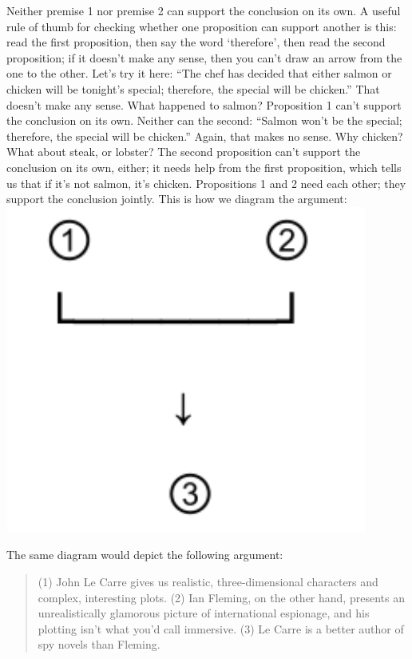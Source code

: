 Neither premise 1 nor premise 2 can support the conclusion on its own. A useful rule of thumb for
checking whether one proposition can support another is this: read the first proposition, then say
the word `therefore', then read the second proposition; if it doesn't make any sense, then you can't
draw an arrow from the one to the other. Let's try it here: ``The chef has decided that either salmon
or chicken will be tonight's special; therefore, the special will be chicken.'' That doesn't make any
sense. What happened to salmon? Proposition 1 can't support the conclusion on its own. Neither
can the second: ``Salmon won't be the special; therefore, the special will be chicken.'' Again, that
makes no sense. Why chicken? What about steak, or lobster? The second proposition can't support
the conclusion on its own, either; it needs help from the first proposition, which tells us that if it's
not salmon, it's chicken. Propositions 1 and 2 need each other; they support the conclusion jointly.
This is how we diagram the argument: \\

\includegraphics[scale=.49]{diagram3.pdf}

The same diagram would depict the following argument:

\begin{quote}
(1) John Le Carre gives us realistic, three-dimensional characters and complex, interesting
plots. (2) Ian Fleming, on the other hand, presents an unrealistically glamorous picture of
international espionage, and his plotting isn't what you'd call immersive. (3) Le Carre is a
better author of spy novels than Fleming.
\end{quote}

